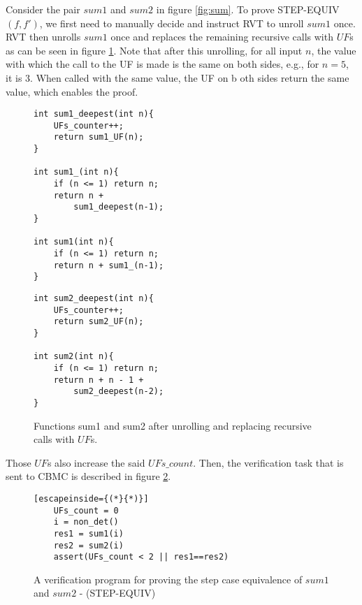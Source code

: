 \begin{example}
Consider the pair $sum1$ and $sum2$ in figure \ref{fig:sum}. To prove STEP-EQUIV$(f,f')$, we first need to manually decide and instruct RVT to unroll $sum1$ once. RVT then unrolls $sum1$ once and replaces the remaining recursive calls with $UF$s as can be seen in figure \ref{fig:sumUnrolled}. Note that after this unrolling, for all input $n$, the value with which the call to the UF is made is the same on both sides, e.g., for $n=5$, it is $3$. When called with the same value, the UF on b oth sides return the same value, which enables the proof. 
\begin{figure}[h]
\begin{center}
\begin{minipage}{7 cm}
\begin{lstlisting}
int sum1_deepest(int n){
	UFs_counter++;
	return sum1_UF(n);
}

int sum1_(int n){
	if (n <= 1) return n;
	return n + 
    	sum1_deepest(n-1);
}

int sum1(int n){
	if (n <= 1) return n;
	return n + sum1_(n-1);
}
\end{lstlisting}
\end{minipage}
\begin{minipage}{7 cm}
\begin{lstlisting}
int sum2_deepest(int n){
	UFs_counter++;
	return sum2_UF(n);
}

int sum2(int n){
	if (n <= 1) return n;
	return n + n - 1 + 
	    sum2_deepest(n-2);
}
\end{lstlisting}
\end{minipage}
\caption{Functions sum1 and sum2 after unrolling and replacing recursive calls with $UF$s.}
\label{fig:sumUnrolled}
\end{center}
\end{figure} 
Those $UF$s also increase the said $UFs\_count$. Then, the verification task that is sent to CBMC is described in figure \ref{fig:rvtstepcase}.

\begin{figure} [h]
\begin{center}
\begin{minipage}{7 cm}
\begin{lstlisting}[escapeinside={(*}{*)}]
	UFs_count = 0
	i = non_det()
	res1 = sum1(i)
	res2 = sum2(i)
	assert(UFs_count < 2 || res1==res2)
\end{lstlisting}
\end{minipage}
\caption{A verification program for proving the step case equivalence of $sum1$ and $sum2$ - (STEP-EQUIV)}
\label{fig:rvtstepcase}
\end{center}
\end{figure}
\end{example}


